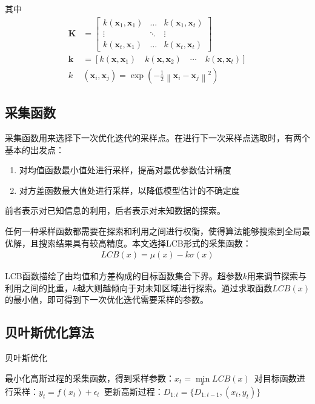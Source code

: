 其中
\begin{align}
\mathbf{K} & =\left[ \begin{array}{ccc}{k\left(\mathbf{x}_{1}, \mathbf{x}_{1}\right)} & {\dots} & {k\left(\mathbf{x}_{1}, \mathbf{x}_{t}\right)} \\ {\vdots} & {\ddots} & {\vdots} \\ {k\left(\mathbf{x}_{t}, \mathbf{x}_{1}\right)} & {\dots} & {k\left(\mathbf{x}_{t}, \mathbf{x}_{t}\right)}\end{array}\right] \\
\mathbf{k}&=\left[k\left(\mathbf{x}, \mathbf{x}_{1}\right) \quad k\left(\mathbf{x}, \mathbf{x}_{2}\right) \quad \cdots \quad k\left(\mathbf{x}, \mathbf{x}_{t}\right)\right] \\
k &\left(\mathbf{x}_{i}, \mathbf{x}_{j}\right)=\exp \left(-\frac{1}{2}\left\|\mathbf{x}_{i}-\mathbf{x}_{j}\right\|^{2}\right)
\end{align}

\subsection{采集函数}

采集函数用来选择下一次优化迭代的采样点。在进行下一次采样点选取时，有两个基本的出发点：
\begin{enumerate}
    \item 对均值函数最小值处进行采样，提高对最优参数估计精度
    \item 对方差函数最大值处进行采样，以降低模型估计的不确定度
\end{enumerate}

前者表示对已知信息的利用，后者表示对未知数据的探索。

任何一种采样函数都需要在探索和利用之间进行权衡，使得算法能够搜索到全局最优解，且搜索结果具有较高精度。本文选择LCB形式的采集函数：
\begin{align}
    LCB(x) = \mu(x) - k\sigma(x)
\end{align}

LCB函数描绘了由均值和方差构成的目标函数集合下界。超参数$k$用来调节探索与利用之间的比重，$k$越大则越倾向于对未知区域进行探索。通过求取函数$LCB(x)$的最小值，即可得到下一次优化迭代需要采样的参数。

\subsection{贝叶斯优化算法}

\begin{algorithm}[h]
    \caption{贝叶斯优化}
    \begin{algorithmic}[1]
    \STATE 最小化高斯过程的采集函数，得到采样参数：$x_t=\mathop{min}\limits_{x}LCB(x)$\
    \STATE 对目标函数进行采样：$y_t = f(x_t)+\epsilon_t$\
    \STATE 更新高斯过程：$D_{1:t} = \{ D_{1:t-1},(x_t,y_t)\}$
    \ENDFOR
    \end{algorithmic}
\end{algorithm}

